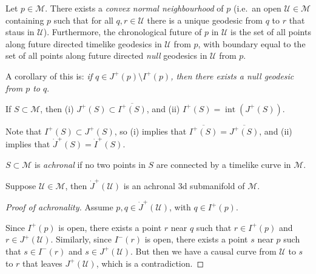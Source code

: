 \documentclass{jknotes}
\begin{document}
\begin{theorem}
    Let \(p \in \mathcal{M}\). There exists a \emph{convex normal neighbourhood} of \(p\) (i.e.\ an open \(\mathcal{U}\in\mathcal{M}\) containing \(p\) such that for all \(q,r \in \mathcal{U}\) there is a unique geodesic from \(q\) to \(r\) that staus in \(\mathcal{U}\)). Furthermore, the chronological future of \(p\) in \(\mathcal{U}\) is the set of all points along future directed timelike geodesics in \(\mathcal{U}\) from \(p\), with boundary equal to the set of all points along future directed \emph{null} geodesics in \(\mathcal{U}\) from \(p\).
\end{theorem}
A corollary of this is: \emph{if \(q \in J^+(p)\setminus I^+(p)\), then there exists a null geodesic from \(p\) to \(q\)}.
\begin{lemma}
    If \(S\subset\mathcal{M}\), then (i) \(J^+(S)\subset\overline{I^+(S)}\), and (ii) \(I^+(S) = \operatorname{int}(J^+(S))\).
\end{lemma}
Note that \(I^+(S)\subset J^+(S)\), so (i) implies that \(\overline{I^+(S)} = \overline{J^+(S)}\), and (ii) implies that \(\dot{J}^+(S) = \dot{I}^+(S)\).
\begin{defn}
    \(S\subset \mathcal{M}\) is \emph{achronal} if no two points in \(S\) are connected by a timelike curve in \(\mathcal{M}\).
\end{defn}
\begin{theorem}
    Suppose \(\mathcal{U}\in\mathcal{M}\), then \(\dot{J}^+(\mathcal{U})\) is an achronal 3d submanifold of \(\mathcal{M}\).
    \label{achronalaf}
\end{theorem}
\begin{proof}[Proof of achronality]
    Assume \(p,q \in\dot{J}^+(\mathcal{U})\), with \(q\in I^+(p)\). 
    \begin{figure}[H]
        \centering
    \end{figure}
    Since \(I^+(p)\) is open, there exists a point \(r\) near \(q\) such that \(r \in I^+(p)\) and \(r \in J^+(\mathcal{U})\). Similarly, since \(I^-(r)\) is open, there exists a point \(s\) near \(p\) such that \(s \in I^-(r)\) and \(s \in J^+(\mathcal{U})\). But then we have a causal curve from \(\mathcal{U}\) to \(s\) to \(r\) that leaves \(J^+(\mathcal{U})\), which is a contradiction.
\end{proof}
\end{document}
